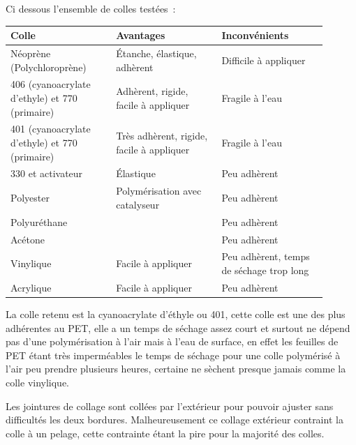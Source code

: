 \documentclass[a4paper,11pt]{article}
\begin{document}
Ci dessous l'ensemble de colles testées~:

\begin{center}
  \begin{tabular}{|p{0.3\linewidth}|p{0.3\linewidth}|p{0.3\linewidth}|}
		\hline
		Colle & Avantages & Inconvénients \\
		\hline

		\rowcolor{OrangeT}
		Néoprène (Polychloroprène) &
		Étanche, élastique, adhèrent &
		Difficile à appliquer \\
		\hline

		\rowcolor{OrangeT}
		406 (cyanoacrylate d'ethyle) et 770 (primaire) &
		Adhèrent, rigide, facile à appliquer &
		Fragile à l'eau \\
		\hline

		\rowcolor{GreenT}
		401 (cyanoacrylate d'ethyle) et 770 (primaire) &
		Très adhèrent, rigide, facile à appliquer &
		Fragile à l'eau \\
		\hline

		\rowcolor{RedT}
		330 et activateur &
		Élastique &
		Peu adhèrent \\
		\hline

		\rowcolor{RedT}
		Polyester &
		Polymérisation avec catalyseur &
		Peu adhèrent \\
		\hline

		\rowcolor{RedT}
		Polyuréthane &
		& Peu adhèrent \\
		\hline

		\rowcolor{RedT}
		Acétone &
		& Peu adhèrent \\
		\hline

		\rowcolor{RedT}
		Vinylique &
		Facile à appliquer &
		Peu adhèrent, temps de séchage trop long \\
		\hline

		\rowcolor{RedT}
		Acrylique &
		Facile à appliquer &
		Peu adhèrent \\
		\hline
  \end{tabular}
\end{center}

La colle retenu est la cyanoacrylate d'éthyle ou 401, cette colle est une des plus adhérentes au PET, elle a un temps de séchage assez court et surtout ne dépend pas d'une polymérisation à l'air mais à l'eau de surface, en effet les feuilles de PET étant très imperméables le temps de séchage pour une colle polymérisé à l'air peu prendre plusieurs heures, certaine ne sèchent presque jamais comme la colle vinylique.

Les jointures de collage sont collées par l'extérieur pour pouvoir ajuster sans difficultés les deux bordures. Malheureusement ce collage extérieur contraint la colle à un pelage, cette contrainte étant la pire pour la majorité des colles.
\end{document}
